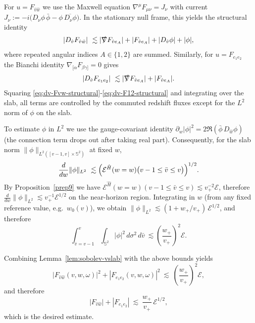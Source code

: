 \documentclass[11pt]{article}
\numberwithin{equation}{section}
\theoremstyle{plain}
\theoremstyle{definition}
\theoremstyle{remark}
\newcommand{\vplus}{v_{+}}
\newcommand{\wplus}{w_{+}}
\begin{document}
For $u=F_{\hat v\hat w}$ we use the Maxwell equation $\nabla^{\mu}F_{\mu\nu}=J_{\nu}$ with current
$J_{\nu}:=-i\bigl(D_{\nu}\phi\,\bar\phi-\phi\,\overline{D_{\nu}\phi}\bigr)$.
In the stationary null frame, this yields the structural identity
\begin{equation}\label{eq:dv-Fvw-structural}
|D_{\hat v}F_{\hat v\hat w}|
\ \lesssim
|\slashed{\nabla}F_{\hat v e_{A}}|+|F_{\hat v e_{A}}|+|D_{\hat v}\phi|+|\phi|,
\end{equation}
where repeated angular indices $A\in\{1,2\}$ are summed.
Similarly, for $u=F_{e_{1}e_{2}}$ the Bianchi identity $\nabla_{[\alpha}F_{\beta\gamma]}=0$ gives
\begin{equation}\label{eq:dv-F12-structural}
|D_{\hat v}F_{e_{1}e_{2}}|
\ \lesssim
|\slashed{\nabla}F_{\hat v e_{A}}|+|F_{\hat v e_{A}}|.
\end{equation}
Squaring \eqref{eq:dv-Fvw-structural}-\eqref{eq:dv-F12-structural} and integrating over the slab,
all terms are controlled by the commuted redshift fluxes except for the $L^{2}$ norm of $\phi$ on the slab.

To estimate $\phi$ in $L^{2}$ we use the gauge-covariant identity
$\partial_{w}|\phi|^{2}=2\Re(\bar\phi\,D_{\hat w}\phi)$ (the connection term drops out after taking real part).
Consequently, for the slab norm $\|\phi\|_{L^{2}([v-1,v]\times\mathbb S^{2})}$ at fixed $w$,
\begin{equation}\label{eq:d-w-L2phi}
\frac{d}{dw}\|\phi\|_{L^{2}}\ \lesssim
\Bigl(\mathcal{E}^{\hat H}(w=w)\bigl(v-1\le \bar v\le v\bigr)\Bigr)^{1/2}.
\end{equation}
By Proposition~\ref{prep9} we have
$\mathcal{E}^{\hat H}(w=w)(v-1\le \bar v\le v)\lesssim \vplus^{-2}\mathcal E$,
therefore $\frac{d}{dw}\|\phi\|_{L^{2}}\lesssim \vplus^{-1}\mathcal E^{1/2}$ on the near-horizon region.
Integrating in $w$ (from any fixed reference value, e.g.\ $w_0(v)$), we obtain
$\|\phi\|_{L^{2}}\lesssim (1+\wplus/\vplus)\,\mathcal E^{1/2}$, and therefore
\begin{equation}\label{eq:L2phi-near}
\int_{\bar v=v-1}^{v}\int_{\mathbb S^{2}}|\phi|^{2}\,d\sigma^{2}\,d\bar v
\ \lesssim
\left(\frac{\wplus}{\vplus}\right)^{2}\mathcal{E}.
\end{equation}

Combining Lemma~\ref{lem:sobolev-vslab} with the above bounds yields
\begin{equation}
|F_{\hat v\hat w}(v,w,\omega)|^{2}+|F_{e_{1}e_{2}}(v,w,\omega)|^{2}
\ \lesssim\ \left(\frac{\wplus}{\vplus}\right)^{2}\mathcal{E},
\end{equation}
and therefore
\begin{equation}
|F_{\hat v\hat w}|+|F_{e_{1}e_{2}}|
\ \lesssim\ \frac{\wplus}{\vplus}\,\mathcal{E}^{1/2},
\end{equation}
which is the desired estimate.
\end{document}
